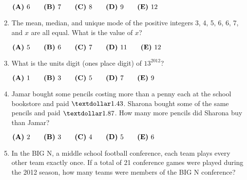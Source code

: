 \documentclass{article}
\begin{document}
\begin{enumerate}[label=\arabic*., itemsep=0.5em]
\( \textbf{(A)}\hspace{.05in}6\qquad\textbf{(B)}\hspace{.05in}7\qquad\textbf{(C)}\hspace{.05in}8\qquad\textbf{(D)}\hspace{.05in}9\qquad\textbf{(E)}\hspace{.05in}12 \)\par \vspace{0.5em}\item The mean, median, and unique mode of the positive integers 3, 4, 5, 6, 6, 7, and \(x\) are all equal. What is the value of \(x\)?

\( \textbf{(A)}\hspace{.05in}5\qquad\textbf{(B)}\hspace{.05in}6\qquad\textbf{(C)}\hspace{.05in}7\qquad\textbf{(D)}\hspace{.05in}11\qquad\textbf{(E)}\hspace{.05in}12 \)\par \vspace{0.5em}\item What is the units digit (ones place digit) of  \(13^{2012}\)?

\( \textbf{(A)}\hspace{.05in}1\qquad\textbf{(B)}\hspace{.05in}3\qquad\textbf{(C)}\hspace{.05in}5\qquad\textbf{(D)}\hspace{.05in}7\qquad\textbf{(E)}\hspace{.05in}9 \)\par \vspace{0.5em}\item Jamar bought some pencils costing more than a penny each at the school bookstore and paid \( 
\textdollar 1.43 \). Sharona bought some of the same pencils and paid \( \textdollar 1.87 \). How many more pencils did Sharona buy than Jamar?

\( \textbf{(A)}\hspace{.05in}2\qquad\textbf{(B)}\hspace{.05in}3\qquad\textbf{(C)}\hspace{.05in}4\qquad\textbf{(D)}\hspace{.05in}5\qquad\textbf{(E)}\hspace{.05in}6 \)\par \vspace{0.5em}\item In the BIG N, a middle school football conference, each team plays every other team exactly once. If a total of 21 conference games were played during the 2012 season, how many teams were members of the BIG N conference?


\end{enumerate}
\end{document}
